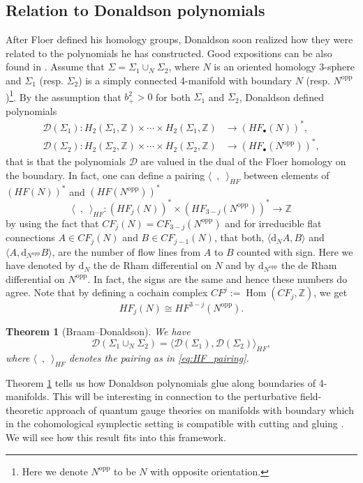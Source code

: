 \documentclass[11pt,colorinlistoftodos]{amsart}
\numberwithin{equation}{subsection}
\theoremstyle{plain}
\newtheorem{thm}{Theorem}[subsection]
\theoremstyle{definition}
\theoremstyle{remark}
\newcommand{\calD}{\mathcal{D}}
\newcommand{\dd}{{\mathrm{d}}}
\DeclareMathOperator{\Hom}{Hom}
\begin{document}
\subsection{Relation to Donaldson polynomials}\label{subsec:relation_to_Donaldson_polynomials}
After Floer defined his homology groups, Donaldson soon realized how they were related to the polynomials he has constructed. Good expositions can be also found in \cite{Atiyah1987,Braam1991}. Assume that $\Sigma=\Sigma_1\cup_{N} \Sigma_2$, where $N$ is an oriented homology 3-sphere and $\Sigma_1$ (resp. $\Sigma_2$) is a simply connected 4-manifold with boundary $N$ (resp. $N^\mathrm{opp}$)\footnote{Here we denote $N^\mathrm{opp}$ to be $N$ with opposite orientation.}. By the assumption that $b^2_+>0$ for both $\Sigma_1$ and $\Sigma_2$, Donaldson defined polynomials
\begin{align}
    \calD(\Sigma_1)\colon H_2(\Sigma_1,\mathbb{Z})\times \dotsm\times H_2(\Sigma_1,\mathbb{Z})&\to (HF_\bullet(N))^*,\\
    \calD(\Sigma_2)\colon H_2(\Sigma_2,\mathbb{Z})\times \dotsm \times H_2(\Sigma_2,\mathbb{Z})&\to (HF_\bullet(N^\mathrm{opp}))^*,
\end{align}
that is that the polynomials $\calD$ are valued in the dual of the Floer homology on the boundary. In fact, one can define a pairing $\langle\enspace,\enspace\rangle_{HF}$ between elements of $(HF(N))^*$ and $(HF(N^\mathrm{opp}))^*$ 
\begin{equation}
\label{eq:HF_pairing}
\langle\enspace,\enspace\rangle_{HF}\colon (HF_j(N))^*\times (HF_{3-j}(N^\mathrm{opp}))^*\to \mathbb{Z}
\end{equation}
by using the fact that $CF_j(N)=CF_{3-j}(N^\mathrm{opp})$ and for irreducible flat connections $A\in CF_j(N)$ and $B\in CF_{j-1}(N)$, that both, $\langle \dd_N A,B\rangle$ and $\langle A,\dd_{N^\mathrm{opp}}B\rangle$, are the number of flow lines from $A$ to $B$ counted with sign. Here we have denoted by $\dd_N$ the de Rham differential on $N$ and by $\dd_{N^\mathrm{opp}}$ the de Rham differential on $N^\mathrm{opp}$.
In fact, the signs are the same and hence these numbers do agree. Note that by defining a cochain complex $CF^j:=\Hom(CF_j,\mathbb{Z})$, we get
\[
HF_j(N)\cong HF^{3-j}(N^\mathrm{opp}).
\]

\begin{thm}[Braam--Donaldson\cite{BraamDonaldson1995,Donaldson2002}]
\label{thm:Donaldson_gluing}
We have 
\[
\calD(\Sigma_1\cup_N\Sigma_2)=\langle \calD(\Sigma_1),\calD(\Sigma_2)\rangle_{HF},
\]
where $\langle\enspace,\enspace\rangle_{HF}$ denotes the pairing as in \eqref{eq:HF_pairing}.
\end{thm}
Theorem \ref{thm:Donaldson_gluing} tells us how Donaldson polynomials glue along boundaries of 4-manifolds. This will be interesting in connection to the perturbative field-theoretic approach of quantum gauge theories on manifolds with boundary which in the cohomological symplectic setting is compatible with cutting and gluing \cite{CMR2}. We will see how this result fits into this framework. 
\end{document}
